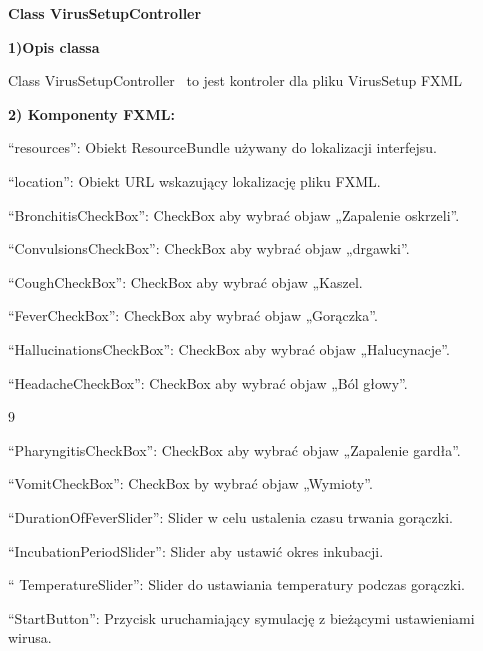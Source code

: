 \documentclass[a4paper]{article}
\begin{document}
\bigskip


\bigskip

{\centering
\foreignlanguage{polish}{\textbf{Class VirusSetupController}}
\par}
\vspace{6pt}
\foreignlanguage{polish}{\textbf{1)Opis classa}}

\foreignlanguage{english}{Class VirusSetupController \ to jest kontroler dla pliku VirusSetup FXML}


\bigskip

\foreignlanguage{polish}{\textbf{2) Komponenty FXML:}}

\foreignlanguage{polish}{“resources”: Obiekt ResourceBundle używany do lokalizacji interfejsu.}

\foreignlanguage{polish}{“location”: Obiekt URL wskazujący lokalizację pliku FXML.}

\foreignlanguage{polish}{“BronchitisCheckBox”: CheckBox aby wybrać objaw „Zapalenie oskrzeli”.}

\foreignlanguage{polish}{“ConvulsionsCheckBox”: CheckBox aby wybrać objaw „drgawki”.}

\foreignlanguage{polish}{“CoughCheckBox”: CheckBox aby wybrać objaw „Kaszel.}

\foreignlanguage{polish}{“FeverCheckBox”: CheckBox aby wybrać objaw „Gorączka”.}

\foreignlanguage{polish}{“HallucinationsCheckBox”: CheckBox aby wybrać objaw „Halucynacje”.}

\foreignlanguage{polish}{“HeadacheCheckBox”: CheckBox aby wybrać objaw „Ból głowy”.}
\begin{center}
	9
\end{center}
\newpage

\foreignlanguage{polish}{“PharyngitisCheckBox”: CheckBox aby wybrać objaw „Zapalenie gardła”.}

\foreignlanguage{polish}{“VomitCheckBox”: CheckBox by wybrać objaw „Wymioty”.}

\foreignlanguage{polish}{“DurationOfFeverSlider”: Slider w celu ustalenia czasu trwania gorączki.}

\foreignlanguage{polish}{“IncubationPeriodSlider”: Slider aby ustawić okres inkubacji.}

\foreignlanguage{polish}{“ TemperatureSlider”: Slider do ustawiania temperatury podczas gorączki.}

\foreignlanguage{polish}{“StartButton”: Przycisk uruchamiający symulację z bieżącymi ustawieniami wirusa.}
\end{document}
